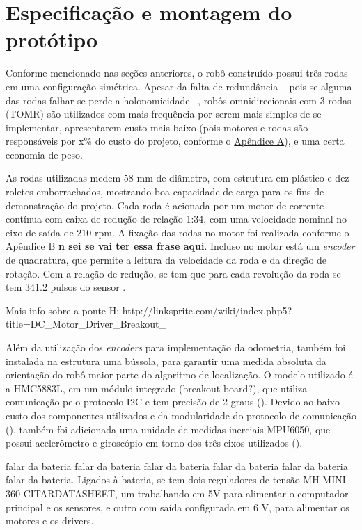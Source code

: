 

\section{Especificação e montagem do protótipo}
\label{sec:montagem}

Conforme mencionado nas seções anteriores, o robô construído possui três rodas em uma configuração simétrica. Apesar da falta de redundância -- pois se alguma das rodas falhar se perde a holonomicidade --, robôs omnidirecionais com 3 rodas (TOMR) são utilizados com mais frequência por serem mais simples de se implementar, apresentarem custo mais baixo (pois motores e rodas são responsáveis por x\% do custo do projeto, conforme o \hyperref[sec:custo]{Apêndice A}), e uma certa economia de peso.

As rodas utilizadas medem 58 mm de diâmetro, com estrutura em plástico e dez roletes emborrachados, mostrando boa capacidade de carga para os fins de demonstração do projeto. Cada roda é acionada por um motor de corrente contínua com caixa de redução de relação 1:34, com uma velocidade nominal no eixo de saída de 210 rpm. A fixação das rodas no motor foi realizada conforme o Apêndice B \textbf{n sei se vai ter essa frase aqui}. Incluso no motor está um \textit{encoder} de quadratura, que permite a leitura da velocidade da roda e da direção de rotação. Com a relação de redução, se tem que para cada revolução da roda se tem 341.2 pulsos do sensor \cite{motor}.


Mais info sobre a ponte H: http://linksprite.com/wiki/index.php5?title=DC_Motor_Driver_Breakout_%

Além da utilização dos \textit{encoders} para implementação da odometria, também foi instalada na estrutura uma bússola, para garantir uma medida absoluta da orientação do robô maior parte do algoritmo de localização. O modelo utilizado é a HMC5883L, em um módulo integrado (breakout board?), que utiliza comunicação pelo protocolo I2C e tem precisão de 2 graus (\cite{HMC5883L}). Devido ao baixo custo dos componentes utilizados e da modularidade do protocolo de comunicação (\cite{semiconductors2000i2c}), também foi adicionada uma unidade de medidas inerciais MPU6050, que possui acelerômetro e giroscópio em torno dos três eixos utilizados (\cite{MPU6050}).

falar da bateria falar da bateria falar da bateria falar da bateria falar da bateria falar da bateria. Ligados à bateria, se tem dois reguladores de tensão MH-MINI-360 CITARDATASHEET, um trabalhando em 5V para alimentar o computador principal e os sensores, e outro com saída configurada em 6 V, para alimentar os motores e os drivers.

